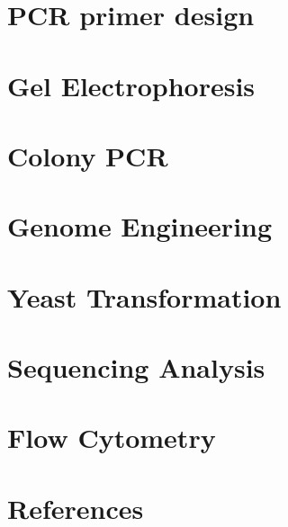 \documentclass[
  letterpaper,
  DIV=11,
  numbers=noendperiod]{scrreprt}
\newlength{\cslhangindent}
\newenvironment{CSLReferences}[2] %
 {\begin{list}{}{%
  \setlength{\itemindent}{0pt}
  \setlength{\leftmargin}{0pt}
  \setlength{\parsep}{0pt}
  \ifodd #1
   \setlength{\leftmargin}{\cslhangindent}
   \setlength{\itemindent}{-1\cslhangindent}
  \fi
  \setlength{\itemsep}{#2\baselineskip}}}
 {\end{list}}
\begin{document}

\chapter{PCR primer design}\label{pcr-primer-design}


\chapter{Gel Electrophoresis}\label{gel-electrophoresis}


\chapter{Colony PCR}\label{colony-pcr}


\chapter{Genome Engineering}\label{genome-engineering}


\chapter{Yeast Transformation}\label{yeast-transformation}


\chapter{Sequencing Analysis}\label{sequencing-analysis}


\chapter{Flow Cytometry}\label{flow-cytometry}


\chapter*{References}\label{references}


\label{refs}
\begin{CSLReferences}{0}{1}
\end{CSLReferences}
\end{document}
